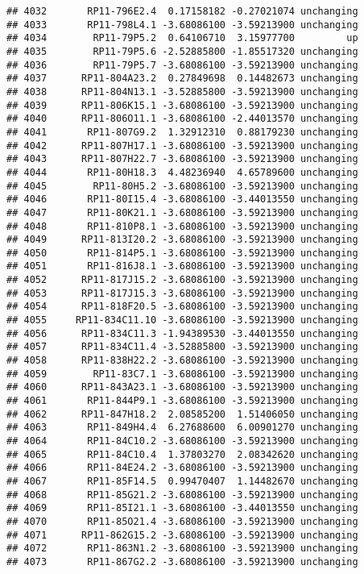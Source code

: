 \documentclass[]{article}
\begin{document}
\begin{verbatim}
## 4032       RP11-796E2.4  0.17158182 -0.27021074 unchanging
## 4033       RP11-798L4.1 -3.68086100 -3.59213900 unchanging
## 4034        RP11-79P5.2  0.64106710  3.15977700         up
## 4035        RP11-79P5.6 -2.52885800 -1.85517320 unchanging
## 4036        RP11-79P5.7 -3.68086100 -3.59213900 unchanging
## 4037      RP11-804A23.2  0.27849698  0.14482673 unchanging
## 4038      RP11-804N13.1 -3.52885800 -3.59213900 unchanging
## 4039      RP11-806K15.1 -3.68086100 -3.59213900 unchanging
## 4040      RP11-806O11.1 -3.68086100 -2.44013570 unchanging
## 4041       RP11-807G9.2  1.32912310  0.88179230 unchanging
## 4042      RP11-807H17.1 -3.68086100 -3.59213900 unchanging
## 4043      RP11-807H22.7 -3.68086100 -3.59213900 unchanging
## 4044       RP11-80H18.3  4.48236940  4.65789600 unchanging
## 4045        RP11-80H5.2 -3.68086100 -3.59213900 unchanging
## 4046       RP11-80I15.4 -3.68086100 -3.44013550 unchanging
## 4047       RP11-80K21.1 -3.68086100 -3.59213900 unchanging
## 4048       RP11-810P8.1 -3.68086100 -3.59213900 unchanging
## 4049      RP11-813I20.2 -3.68086100 -3.59213900 unchanging
## 4050       RP11-814P5.1 -3.68086100 -3.59213900 unchanging
## 4051       RP11-816J8.1 -3.68086100 -3.59213900 unchanging
## 4052      RP11-817J15.2 -3.68086100 -3.59213900 unchanging
## 4053      RP11-817J15.3 -3.68086100 -3.59213900 unchanging
## 4054      RP11-818F20.5 -3.68086100 -3.59213900 unchanging
## 4055     RP11-834C11.10 -3.68086100 -3.59213900 unchanging
## 4056      RP11-834C11.3 -1.94389530 -3.44013550 unchanging
## 4057      RP11-834C11.4 -3.52885800 -3.59213900 unchanging
## 4058      RP11-838H22.2 -3.68086100 -3.59213900 unchanging
## 4059        RP11-83C7.1 -3.68086100 -3.59213900 unchanging
## 4060      RP11-843A23.1 -3.68086100 -3.59213900 unchanging
## 4061       RP11-844P9.1 -3.68086100 -3.59213900 unchanging
## 4062      RP11-847H18.2  2.08585200  1.51406050 unchanging
## 4063       RP11-849H4.4  6.27688600  6.00901270 unchanging
## 4064       RP11-84C10.2 -3.68086100 -3.59213900 unchanging
## 4065       RP11-84C10.4  1.37803270  2.08342620 unchanging
## 4066       RP11-84E24.2 -3.68086100 -3.59213900 unchanging
## 4067       RP11-85F14.5  0.99470407  1.14482670 unchanging
## 4068       RP11-85G21.2 -3.68086100 -3.59213900 unchanging
## 4069       RP11-85I21.1 -3.68086100 -3.44013550 unchanging
## 4070       RP11-85O21.4 -3.68086100 -3.59213900 unchanging
## 4071      RP11-862G15.2 -3.68086100 -3.59213900 unchanging
## 4072       RP11-863N1.2 -3.68086100 -3.59213900 unchanging
## 4073       RP11-867G2.2 -3.68086100 -3.59213900 unchanging

\end{verbatim}
\end{document}
